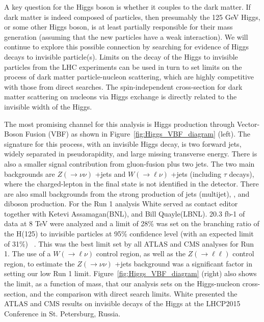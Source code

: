 A key question for the Higgs boson is whether it couples to the dark matter. 
If dark matter is indeed composed of particles, then presumably the 
125 GeV Higgs, or some other Higgs boson, is at least partially responsible 
for their mass generation (assuming that the new particles have a weak interaction).
We will continue to explore this possible connection by 
searching for evidence of Higgs decays to invisible particle(s).
Limits on the decay of the Higgs to invisible particles from the LHC experiments can be used in turn to set limits
on the process of dark matter particle-nucleon scattering, which are highly competitive with those from direct searches. 
The spin-independent cross-section for dark matter scattering on nucleons via Higgs exchange is directly related to the
invisible width of the Higgs.


The most promising channel for this analysis is Higgs production through Vector-Boson Fusion (VBF) 
as shown in Figure~\ref{fig:Higgs_VBF_diagram} (left). The signature for this process, with an invisible Higgs decay, 
is two forward jets, widely separated in pseudorapidity, and large missing transverse energy.
There is also a smaller signal contribution from gluon-fusion plus two jets.
The two main backgrounds are  $Z (\rightarrow \nu\nu)$ +jets and $W (\rightarrow \ell\nu) $ +jets (including $ \tau $ decays), 
where the charged-lepton in the final state is not identified in the detector. There are also
small backgrounds from the strong production of jets (multijet), \ttbar, and diboson production.
For the Run 1 analysis White served as contact editor together with Ketevi Assamagan(BNL), and Bill Quayle(LBNL). 
20.3 fb-1 of data at 8 TeV were analyzed and a limit of 28\% was set on the branching ratio of the H(125) to
 invisible particles at 95\% confidence level (with an expected limit of 31\%) ~\cite{HinvRun1}. This was the best limit set 
by all ATLAS and CMS analyses for Run 1. The use of a $W(\rightarrow \ell\nu) $ control region, as well as the
$Z (\rightarrow \ell\ell) $ control region, to estimate the $Z (\rightarrow \nu\nu) $ +jets background was a 
significant factor in setting our low Run 1 limit. Figure~\ref{fig:Higgs_VBF_diagram} (right) also shows the limit, as a function of mass, 
that our analysis sets on the Higgs-nucleon cross-section, and the comparison with direct search limits. 
White presented the ATLAS and CMS results on invisible decays of the Higgs at the LHCP2015 Conference in St. Petersburg, Russia. ~\cite{LHCP2015}

